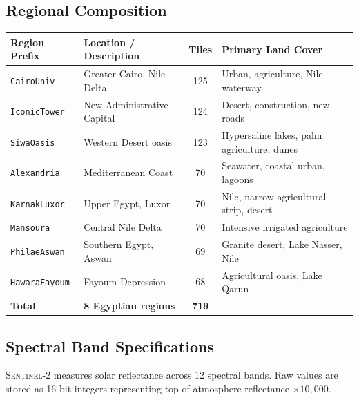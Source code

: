 \documentclass[12pt, a4paper]{article}
\newcommand{\sentinel}{\textsc{Sentinel-2}}
\begin{document}
\subsection{Regional Composition}

\begin{center}
\renewcommand{\arraystretch}{1.25}
\begin{tabular}{llcl}
\toprule
\textbf{Region Prefix} & \textbf{Location / Description} & \textbf{Tiles} & \textbf{Primary Land Cover} \\
\midrule
\rowcolor{rowalt}
\texttt{CairoUniv}     & Greater Cairo, Nile Delta          & 125 & Urban, agriculture, Nile waterway \\
\texttt{IconicTower}   & New Administrative Capital         & 124 & Desert, construction, new roads \\
\rowcolor{rowalt}
\texttt{SiwaOasis}     & Western Desert oasis               & 123 & Hypersaline lakes, palm agriculture, dunes \\
\texttt{Alexandria}    & Mediterranean Coast                & 70  & Seawater, coastal urban, lagoons \\
\rowcolor{rowalt}
\texttt{KarnakLuxor}   & Upper Egypt, Luxor                 & 70  & Nile, narrow agricultural strip, desert \\
\texttt{Mansoura}      & Central Nile Delta                 & 70  & Intensive irrigated agriculture \\
\rowcolor{rowalt}
\texttt{PhilaeAswan}   & Southern Egypt, Aswan              & 69  & Granite desert, Lake Nasser, Nile \\
\texttt{HawaraFayoum}  & Fayoum Depression                  & 68  & Agricultural oasis, Lake Qarun \\
\midrule
\textbf{Total}         & \textbf{8 Egyptian regions}        & \textbf{719} & \\
\bottomrule
\end{tabular}
\end{center}

\subsection{Spectral Band Specifications}

\sentinel{} measures solar reflectance across 12 spectral bands. Raw values are stored as 16-bit integers representing top-of-atmosphere reflectance $\times 10{,}000$.
\end{document}
